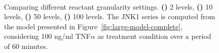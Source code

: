 \documentclass{bmcart}
\begin{document}
\begin{figure}[htpb]
\begin{minipage}{\textwidth}
\centering
{} \qquad
{} \\
 \qquad
{}
\caption{Comparing different reactant granularity settings. {\bfseries (\protect{})} 2 levels, {\bfseries (\protect{})} 10 levels,  {\bfseries (\protect{})} 50 levels, {\bfseries (\protect{})} 100 levels. The {\sf JNK1} series is computed from the model presented in Figure~\ref{fig:large-model-complete}, considering 100 ng/ml TNF$\alpha$ as treatment condition over a period of 60 minutes.}\label{fig:levels}
\end{minipage}
\end{figure}
\end{document}
